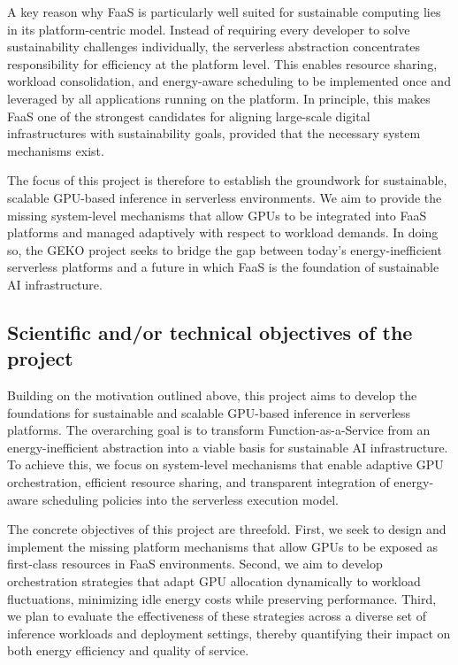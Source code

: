 A key reason why FaaS is particularly well suited for sustainable computing lies in its platform-centric model.
Instead of requiring every developer to solve sustainability challenges individually, the serverless abstraction concentrates responsibility for efficiency at the platform level.
This enables resource sharing, workload consolidation, and energy-aware scheduling to be implemented once and leveraged by all applications running on the platform.
In principle, this makes FaaS one of the strongest candidates for aligning large-scale digital infrastructures with sustainability goals, provided that the necessary system mechanisms exist.

The focus of this project is therefore to establish the groundwork for sustainable, scalable GPU-based inference in serverless environments.
We aim to provide the missing system-level mechanisms that allow GPUs to be integrated into FaaS platforms and managed adaptively with respect to workload demands.
In doing so, the GEKO project seeks to bridge the gap between today's energy-inefficient serverless platforms and a future in which FaaS is the foundation of sustainable AI infrastructure.


\subsection{Scientific and/or technical objectives of the project}

Building on the motivation outlined above, this project aims to develop the foundations for sustainable and scalable GPU-based inference in serverless platforms. The overarching goal is to transform Function-as-a-Service from an energy-inefficient abstraction into a viable basis for sustainable AI infrastructure. To achieve this, we focus on system-level mechanisms that enable adaptive GPU orchestration, efficient resource sharing, and transparent integration of energy-aware scheduling policies into the serverless execution model.

The concrete objectives of this project are threefold. First, we seek to design and implement the missing platform mechanisms that allow GPUs to be exposed as first-class resources in FaaS environments. Second, we aim to develop orchestration strategies that adapt GPU allocation dynamically to workload fluctuations, minimizing idle energy costs while preserving performance. Third, we plan to evaluate the effectiveness of these strategies across a diverse set of inference workloads and deployment settings, thereby quantifying their impact on both energy efficiency and quality of service.


